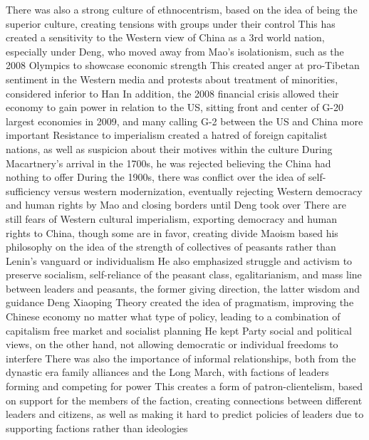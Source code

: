 \documentclass[11 pt, twoside]{article}
\newenvironment{outline*}
{
	\begin{outline}[enumerate]
	}
	{\end{outline}
}
\begin{document}
\begin{outline*}
\3 There was also a strong culture of ethnocentrism, based on the idea of being the superior culture, creating tensions with groups under their control
\3 This has created a sensitivity to the Western view of China as a 3rd world nation, especially under Deng, who moved away from Mao's isolationism, such as the 2008 Olympics to showcase economic strength
\4 This created anger at pro-Tibetan sentiment in the Western media and protests about treatment of minorities, considered inferior to Han
\3 In addition, the 2008 financial crisis allowed their economy to gain power in relation to the US, sitting front and center of G-20 largest economies in 2009, and many calling G-2 between the US and China more important
\2 Resistance to imperialism created a hatred of foreign capitalist nations, as well as suspicion about their motives within the culture
\3 During Macartnery's arrival in the 1700s, he was rejected believing the China had nothing to offer
\3 During the 1900s, there was conflict over the idea of self-sufficiency versus western modernization, eventually rejecting Western democracy and human rights by Mao and closing borders until Deng took over
\3 There are still fears of Western cultural imperialism, exporting democracy and human rights to China, though some are in favor, creating divide
\2 Maoism based his philosophy on the idea of the strength of collectives of peasants rather than Lenin's vanguard or individualism
\3 He also emphasized struggle and activism to preserve socialism, self-reliance of the peasant class, egalitarianism, and mass line between leaders and peasants, the former giving direction, the latter wisdom and guidance
\2 Deng Xiaoping Theory created the idea of pragmatism, improving the Chinese economy no matter what type of policy, leading to a combination of capitalism free market and socialist planning
\3 He kept Party social and political views, on the other hand, not allowing democratic or individual freedoms to interfere
\2 There was also the importance of informal relationships, both from the dynastic era family alliances and the Long March, with factions of leaders forming and competing for power
\3 This creates a form of patron-clientelism, based on support for the members of the faction, creating connections between different leaders and citizens, as well as making it hard to predict policies of leaders due to supporting factions rather than ideologies
\end{outline*}
\end{document}
